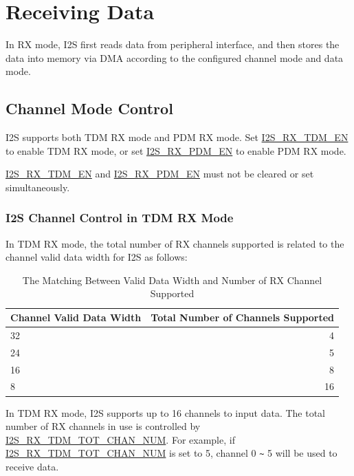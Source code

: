\documentclass[main\_\_EN.tex]{subfiles}
\begin{document}
\section{Receiving Data}\label{sec:i2s-rx-data}


In RX mode, I2S first reads data from peripheral interface, and then stores the data into memory via DMA according to the configured channel mode and data mode.

\subsection{Channel Mode Control}
\chipname{} I2S supports both TDM RX mode and PDM RX mode. Set \hyperref[fielddesc:I2SRXTDMEN]{I2S\_RX\_TDM\_EN} to enable TDM RX mode, or set \hyperref[fielddesc:I2SRXPDMEN]{I2S\_RX\_PDM\_EN} to enable PDM RX mode.

\begin{tiplisting}
\hyperref[fielddesc:I2SRXTDMEN]{I2S\_RX\_TDM\_EN} and \hyperref[fielddesc:I2SRXPDMEN]{I2S\_RX\_PDM\_EN} must not be cleared or set simultaneously.
\end{tiplisting}

\subsubsection{I2S Channel Control in TDM RX Mode}

In TDM RX mode, the total number of RX channels supported is related to the channel valid data width for I2S as follows:

\begin{table}[H]
    \centering
    \caption{The Matching Between Valid Data Width and Number of RX Channel Supported}
    \label{tab:i2s-rx-support-channel}
    \begin{tabular}{|l|r|}
    \hline
    \rowcolor{lightgray}
    \textbf{Channel Valid Data Width} & \textbf{Total Number of Channels Supported} \\ \hline
        32  & 4     \\\hline
        24  & 5     \\\hline
        16  & 8     \\\hline
        8   & 16    \\\hline
    \end{tabular}
\end{table}

In TDM RX mode, I2S supports up to 16 channels to input data. The total number of RX channels in use is controlled by \hyperref[fielddesc:I2SRXTDMTOTCHANNUM]{I2S\_RX\_TDM\_TOT\_CHAN\_NUM}. For example, if  \hyperref[fielddesc:I2SRXTDMTOTCHANNUM]{I2S\_RX\_TDM\_TOT\_CHAN\_NUM} is set to 5, channel 0 \verb+~+ 5 will be used to receive data.
\end{document}
